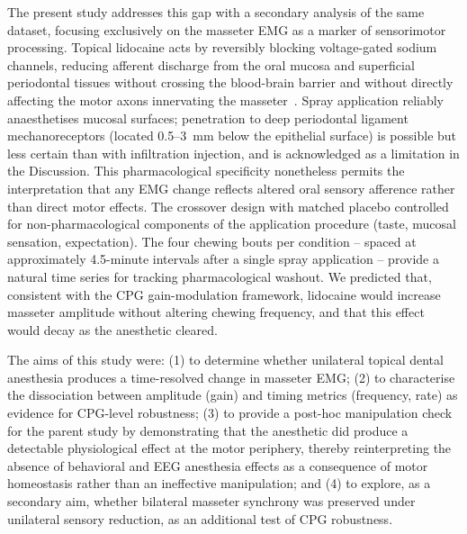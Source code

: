 The present study addresses this gap with a secondary analysis of the same
dataset, focusing exclusively on the masseter EMG as a marker of
sensorimotor processing.
Topical lidocaine acts by reversibly blocking voltage-gated sodium channels,
reducing afferent discharge from the oral mucosa and superficial periodontal
tissues without crossing the blood-brain barrier and without directly
affecting the motor axons innervating the masseter~\cite{vonGunten2019}.
Spray application reliably anaesthetises mucosal surfaces; penetration to
deep periodontal ligament mechanoreceptors (located 0.5--3~mm below the
epithelial surface) is possible but less certain than with infiltration
injection, and is acknowledged as a limitation in the Discussion.
This pharmacological specificity nonetheless permits the interpretation that
any EMG change reflects altered oral sensory afference rather than direct
motor effects.
The crossover design with matched placebo controlled for non-pharmacological
components of the application procedure (taste, mucosal sensation, expectation).
The four chewing bouts per condition -- spaced at approximately 4.5-minute
intervals after a single spray application -- provide a natural time series
for tracking pharmacological washout.
We predicted that, consistent with the CPG gain-modulation framework,
lidocaine would increase masseter amplitude without altering chewing
frequency, and that this effect would decay as the anesthetic cleared.

The aims of this study were: (1) to determine whether unilateral
topical dental anesthesia produces a time-resolved change in masseter EMG;
(2) to characterise the dissociation between amplitude (gain) and timing
metrics (frequency, rate) as evidence for CPG-level robustness;
(3) to provide a post-hoc manipulation check for the parent study by
demonstrating that the anesthetic did produce a detectable physiological effect
at the motor periphery, thereby reinterpreting the absence of behavioral and
EEG anesthesia effects as a consequence of motor homeostasis rather than an
ineffective manipulation; and (4) to explore, as a secondary aim, whether
bilateral masseter synchrony was preserved under unilateral sensory reduction,
as an additional test of CPG robustness.

